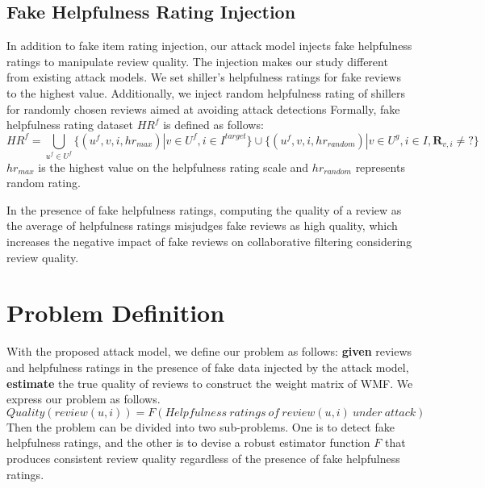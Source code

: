 \documentclass[master,english,final]{kaist-ucs}
\begin{document}
\subsection{Fake Helpfulness Rating Injection}
In addition to fake item rating injection, our attack model injects fake helpfulness ratings to manipulate review quality.
The injection makes our study different from existing attack models.
We set shiller's helpfulness ratings for fake reviews to the highest value.
Additionally, we inject random helpfulness rating of shillers for randomly chosen reviews aimed at avoiding attack detections
Formally, fake helpfulness rating dataset $HR^f$ is defined as follows:
\begin{equation}
HR^f = \bigcup_{u^f \in U^f} \{(u^f,v, i, hr_{max}) | v \in U^f,i \in I^{target} \} \cup \{(u^f,v,i,hr_{random}) | v \in U^g, i \in I, \bm{R}_{v,i} \neq ? \}
\end{equation}
$hr_{max}$ is the highest value on the helpfulness rating scale and $hr_{random}$ represents random rating.

In the presence of fake helpfulness ratings, computing the quality of a review as the average of helpfulness ratings misjudges fake reviews as high quality, which increases the negative impact of fake reviews on collaborative filtering considering review quality.

\section{Problem Definition}
With the proposed attack model, we define our problem as follows: \textbf{given} reviews and helpfulness ratings in the presence of fake data injected by the attack model, \textbf{estimate} the true quality of reviews to construct the weight matrix of WMF.
We express our problem as follows.
\begin{equation} \label{eq:quality_measure}
Quality(review(u,i))=F(Helpfulness\ ratings\ of\ review(u,i)\ under\ attack)
\end{equation}
Then the problem can be divided into two sub-problems.
One is to detect fake helpfulness ratings, and the other is to devise a robust estimator function $F$ that produces consistent review quality regardless of the presence of fake helpfulness ratings.
\end{document}
